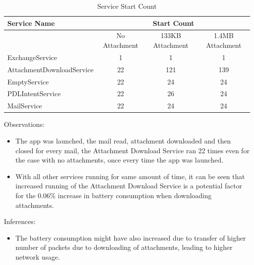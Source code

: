 \begin{table}[!h]
\centering
\caption{Service Start Count}
\label{my-label}
\begin{tabular}{|l|c|c|c|}
\hline
Service Name              & \multicolumn{3}{c|}{Start Count}                    \\ \hline
                          & No Attachment & 133KB Attachment & 1.4MB Attachment \\ \hline
ExchangeService           & 1             & 1                & 1                \\ \hline
AttachmentDownloadService & 22             & 121               & 139              \\ \hline
EmptyService              & 22             & 24                & 24                \\ \hline
PDLIntentService          & 22             & 26                & 24                \\ \hline
MailService               & 22             & 24                & 24                \\ \hline
\end{tabular}
\end{table}
\pagebreak
Observations: 
\begin{itemize}
	\item The app was launched, the mail read, attachment downloaded and then closed for every mail, the Attachment Download Service ran 22 times even for the case with no attachments, once every time the app was launched. 
	\item With all other services running for same amount of time, it can be seen that increased running of the Attachment Download Service is a potential factor for the 0.06\% increase in battery consumption when downloading attachments. 
\end{itemize}
Inferences:
\begin{itemize}
	\item The battery consumption might have also increased due to transfer of higher number of packets due to downloading of attachments, leading to higher network usage.
\end{itemize}

